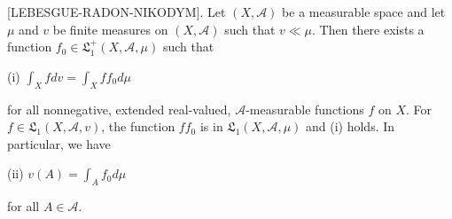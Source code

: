 [LEBESGUE-RADON-NIKODYM]. Let $(X, \mathcal{A})$ be a measurable space and let $\mu$ and $v$ be finite measures on $(X, \mathcal{A})$ such that $v \ll \mu$. Then there exists a function $f_0 \in \mathfrak{L}_1^+ (X, \mathcal{A}, \mu)$ such that

(i) $\int_X f dv = \int_X ff_0 d\mu$

for all nonnegative, extended real-valued, $\mathcal{A}$-measurable functions $f$ on $X$. For $f \in \mathfrak{L}_1 (X, \mathcal{A}, v)$, the function $ff_0$ is in $\mathfrak{L}_1 (X, \mathcal{A}, \mu)$ and (i) holds. In particular, we have

(ii) $v(A) = \int_A f_0 d\mu$

for all $A \in \mathcal{A}$.